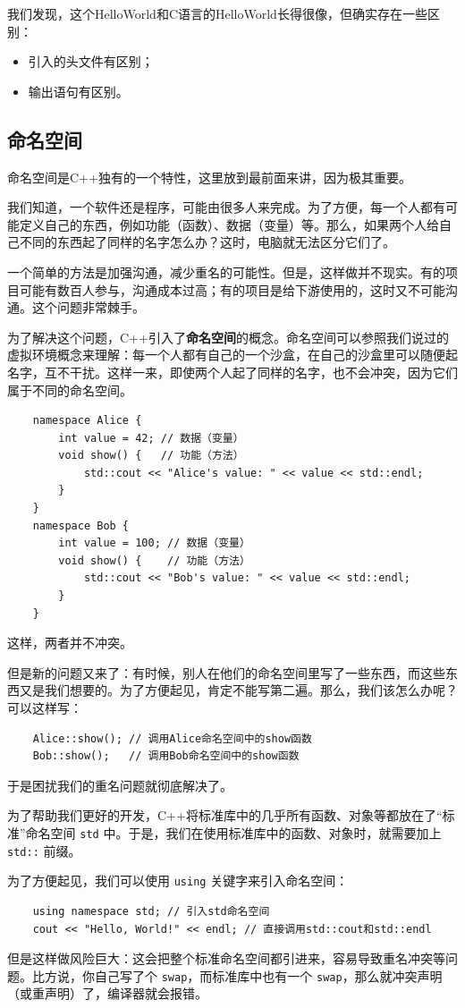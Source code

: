 我们发现，这个HelloWorld和C语言的HelloWorld长得很像，但确实存在一些区别：
\begin{itemize}
    \item 引入的头文件有区别；
    \item 输出语句有区别。
\end{itemize}

\subsection{命名空间}

命名空间是C++独有的一个特性，这里放到最前面来讲，因为极其重要。

我们知道，一个软件还是程序，可能由很多人来完成。为了方便，每一个人都有可能定义自己的东西，例如功能（函数）、数据（变量）等。那么，如果两个人给自己不同的东西起了同样的名字怎么办？这时，电脑就无法区分它们了。

一个简单的方法是加强沟通，减少重名的可能性。但是，这样做并不现实。有的项目可能有数百人参与，沟通成本过高；有的项目是给下游使用的，这时又不可能沟通。这个问题非常棘手。

为了解决这个问题，C++引入了\textbf{命名空间}的概念。命名空间可以参照我们说过的虚拟环境概念来理解：每一个人都有自己的一个沙盒，在自己的沙盒里可以随便起名字，互不干扰。这样一来，即使两个人起了同样的名字，也不会冲突，因为它们属于不同的命名空间。
\begin{verbatim}
    namespace Alice {
        int value = 42; // 数据（变量）
        void show() {   // 功能（方法）
            std::cout << "Alice's value: " << value << std::endl;
        }
    }
    namespace Bob {
        int value = 100; // 数据（变量）
        void show() {    // 功能（方法）
            std::cout << "Bob's value: " << value << std::endl;
        }
    }
\end{verbatim}
这样，两者并不冲突。

但是新的问题又来了：有时候，别人在他们的命名空间里写了一些东西，而这些东西又是我们想要的。为了方便起见，肯定不能写第二遍。那么，我们该怎么办呢？可以这样写：
\begin{verbatim}
    Alice::show(); // 调用Alice命名空间中的show函数
    Bob::show();   // 调用Bob命名空间中的show函数
\end{verbatim}
于是困扰我们的重名问题就彻底解决了。

为了帮助我们更好的开发，C++将标准库中的几乎所有函数、对象等都放在了“标准”命名空间 \verb|std| 中。于是，我们在使用标准库中的函数、对象时，就需要加上 \verb|std::| 前缀。

为了方便起见，我们可以使用 \verb|using| 关键字来引入命名空间：
\begin{verbatim}
    using namespace std; // 引入std命名空间
    cout << "Hello, World!" << endl; // 直接调用std::cout和std::endl
\end{verbatim}
但是这样做风险巨大：这会把整个标准命名空间都引进来，容易导致重名冲突等问题。比方说，你自己写了个 \verb|swap|，而标准库中也有一个 \verb|swap|，那么就冲突声明（或重声明）了，编译器就会报错。

